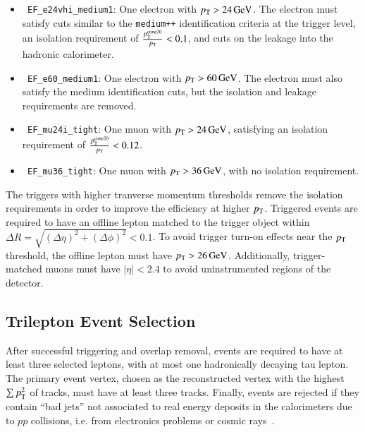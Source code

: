 \begin{itemize}
	\item \texttt{ EF\_e24vhi\_medium1}: One electron with $p_{\text{T}}>\SI{24}{\giga\electronvolt}$. The electron must satisfy cuts similar to the \texttt{medium++} identification criteria at the trigger level, an isolation requirement of $\frac{p_{\text{T}}^{\mathrm{cone}20}}{p_{\text{T}}}<0.1$, and cuts on the leakage into the hadronic calorimeter.
	\item \texttt{ EF\_e60\_medium1}: One electron with $p_{\text{T}}>\SI{60}{\giga\electronvolt}$. The electron must also satisfy the medium identification cuts, but the isolation and leakage requirements are removed.
	\item \texttt{ EF\_mu24i\_tight}: One muon with $p_{\text{T}}>\SI{24}{\giga\electronvolt}$, satisfying an isolation requirement of $\frac{p_{\text{T}}^{\mathrm{cone}20}}{p_{\text{T}}}<0.12$.
	\item \texttt{ EF\_mu36\_tight}: One muon with $p_{\text{T}}>\SI{36}{\giga\electronvolt}$, with no isolation requirement.
\end{itemize}

The triggers with higher tranverse momentum thresholds remove the isolation requirements in order to improve the efficiency at higher $p_{\text{T}}$. Triggered events are required to have an offline lepton matched to the trigger object within $\Delta R=\sqrt{(\Delta\eta)^2+(\Delta\phi)^2} < 0.1$. To avoid trigger turn-on effects near the $p_{\text{T}}$ threshold, the offline lepton must have $p_{\text{T}}>\SI{26}{\giga\electronvolt}$. Additionally, trigger-matched muons must have $|\eta|<2.4$ to avoid uninstrumented regions of the detector.


\subsection{Trilepton Event Selection}\label{sec:model-independent-trilepton-event-selection}
After successful triggering and overlap removal, events are required to have at least three selected leptons, with at most one hadronically decaying tau lepton. The primary event vertex, chosen as the reconstructed vertex with the highest $\sum p_{\text{T}}^2$ of tracks, must have at least three tracks. Finally, events are rejected if they contain ``bad jets'' not associated to real energy deposits in the calorimeters due to $pp$ collisions, i.e. from electronics problems or cosmic rays~\cite{TheATLASCollaboration:2015ds}.



